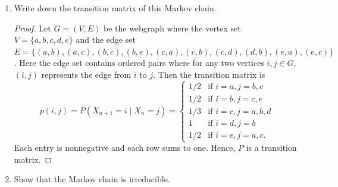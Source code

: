 \documentclass[oneside,reqno]{amsart}
\theoremstyle{definition}
\begin{document}
\begin{enumerate}
\item
Write down the transition matrix of this Markov chain.
\begin{proof}
Let $G=(V,E)$ be the webgraph where the vertex set $V=\{a,b,c,d,e\}$ and the edge set $E =\{(a,b), (a,c), (b,c), (b,e), (c,a), (c,b), (c,d), (d,b), (e,a), (e,c)\}$. Here the edge set contains ordered pairs where for any two vertices $i,j \in G$, $(i,j)$ represents the edge from $i$ to $j$.  Then the transition matrix is 
\[
	p(i,j) = P(X_{n+1} = i \mid X_n = j) 
	= \begin{cases}
		1/2 & \text{if } i=a, j=b,c \\
		1/2 & \text{if } i=b, j=c,e \\
		1/3 & \text{if } i=c, j=a, b, d \\
		1 & \text{if } i=d, j=b \\
		1/2 & \text{if } i=e, j=a,c. 
	\end{cases}
\]
Each entry is nonnegative and each row sums to one. Hence, $P$ is a transition matrix.
\end{proof}

\item
Show that the Markov chain is irreducible.


\end{enumerate}
\end{document}
